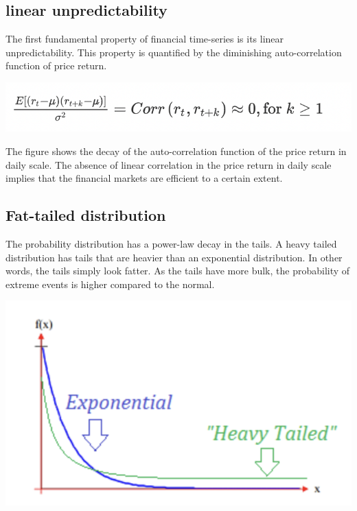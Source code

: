 \documentclass{article}
\begin{document}
\begin{multicols}{2}
    \subsection*{linear unpredictability}
    The first fundamental property of financial time-series is its linear unpredictability. This property is quantified by the diminishing auto-correlation function of price return. \\
     \begin{center}
        \includegraphics[scale = 0.6]{imgs/elisa/lp.jpg} 
    \end{center}
    The figure shows the decay of the auto-correlation function of the price return in daily scale. The absence of linear correlation in the price return in daily scale implies that the financial markets are efficient to a certain extent.\\
    \subsection*{Fat-tailed distribution}
    The probability distribution has a power-law decay in the tails. A heavy tailed distribution has tails that are heavier than an exponential distribution.  In other words, the tails simply look fatter. As the tails have more bulk, the probability of extreme events is higher compared to the normal. 
    \begin{center}
        \includegraphics[scale = 0.6]{imgs/elisa/dist.jpg} 
    \end{center}
    


\end{multicols}
\end{document}
